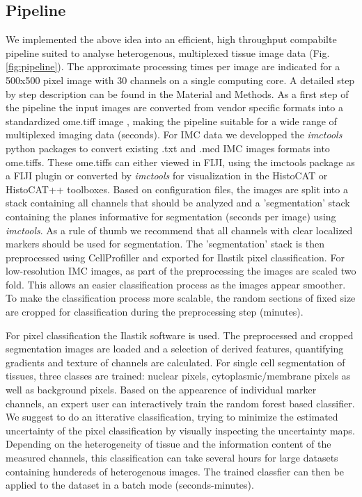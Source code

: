 \documentclass[a4paper]{article}
\begin{document}
\subsection{Pipeline}
We implemented the above idea into an efficient, high throughput compabilte pipeline suited to
analyse heterogenous, multiplexed tissue image data (Fig. \ref{fig:pipeline}).
The approximate processing times per image are indicated for a 500x500 pixel image with 30
channels on a single computing core. A detailed step by step description can be found in the
Material and Methods.
As a first step of the pipeline the input
images are converted from vendor specific formats into a standardized ome.tiff image \cite{goldberg_open_2005}, making the pipeline suitable for a wide range of multiplexed imaging data (\texttildelow seconds). For
IMC data we developped the \textit{imctools} python packages to convert existing .txt and .mcd IMC images
formats into ome.tiffs. These ome.tiffs can either viewed in FIJI, using the imctools package as a
FIJI plugin or converted by \textit{imctools} for visualization in the HistoCAT or HistoCAT++
toolboxes.
Based on configuration files, the images are split into a stack containing all channels that should
be analyzed and a 'segmentation' stack containing the planes informative for segmentation
(\texttildelow seconds per image) using \textit{imctools}. As a rule of thumb we
recommend that all channels with clear localized markers should be used for segmentation.
The 'segmentation' stack is then preprocessed using CellProfiller and exported for Ilastik pixel
classification. For low-resolution IMC images, as part of the preprocessing the images are scaled
two fold. This allows an easier classification process as the images appear smoother. To make the
classification process more scalable, the random sections of fixed size are cropped for
classification during the preprocessing step (\texttildelow minutes).

For pixel classification the Ilastik software is used. The preprocessed and cropped segmentation
images are loaded and a selection of derived features, quantifying gradients and texture of
channels are calculated. For single cell segmentation of tissues, three classes are trained:
nuclear pixels, cytoplasmic/membrane pixels as well as background pixels. Based on the appearence
of individual marker channels, an expert user can interactively train the random forest based
classifier. We suggest to do an
itterative classification, trying to minimize the estimated uncertainty of the pixel classification
by visually inspecting the uncertainty maps.
Depending on the heterogeneity of tissue and the information content of the measured channels, this
classification can take several hours for large datasets containing hundereds of heterogenous
images.
The trained classfier can then be applied to the dataset in a batch mode (\texttildelow seconds-minutes).
\end{document}

